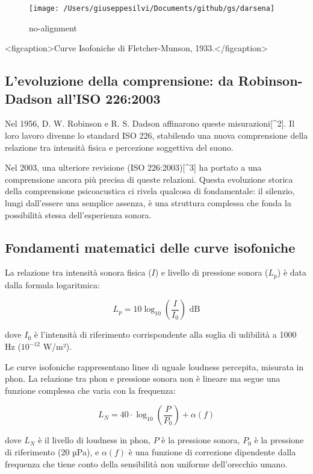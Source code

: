 \documentclass[a4paper,11pt]{article}
\begin{document}
\begin{figure}[htbp]
  \centering
  \texttt{[image: /Users/giuseppesilvi/Documents/github/gs/darsena]}
  \caption{no-alignment}
\end{figure}

<figcaption>Curve Isofoniche di Fletcher-Munson, 1933.</figcaption>

\subsection{L'evoluzione della comprensione: da Robinson-Dadson all'ISO 226:2003}

Nel 1956, D. W. Robinson e R. S. Dadson affinarono queste
misurazioni[^2]. Il loro lavoro divenne lo standard ISO 226, stabilendo
una nuova comprensione della relazione tra intensità fisica e percezione
soggettiva del suono.

Nel 2003, una ulteriore revisione (ISO 226:2003)[^3] ha portato a una
comprensione ancora più precisa di queste relazioni. Questa evoluzione
storica della comprensione psicoacustica ci rivela qualcosa di
fondamentale: il silenzio, lungi dall'essere una semplice assenza, è una
struttura complessa che fonda la possibilità stessa dell'esperienza
sonora.

\subsection{Fondamenti matematici delle curve isofoniche}

La relazione tra intensità sonora fisica ($I$) e livello di pressione
sonora ($L_p$) è data dalla formula logaritmica:

\begin{equation}
L_p = 10 \log_{10}\left(\frac{I}{I_0}\right) \text{ dB}
\end{equation}


dove $I_0$ è l'intensità di riferimento corrispondente alla soglia di
udibilità a 1000 Hz ($10^{-12}$ W/m²).

Le curve isofoniche rappresentano linee di uguale loudness percepita,
misurata in phon. La relazione tra phon e pressione sonora non è lineare
ma segue una funzione complessa che varia con la frequenza:

\begin{equation}
L_N = 40 \cdot \log_{10}\left(\frac{P}{P_0}\right) + \alpha(f)
\end{equation}


dove $L_N$ è il livello di loudness in phon, $P$ è la pressione sonora,
$P_0$ è la pressione di riferimento (20 µPa), e $\alpha(f)$ è una
funzione di correzione dipendente dalla frequenza che tiene conto della
sensibilità non uniforme dell'orecchio umano.
\end{document}
